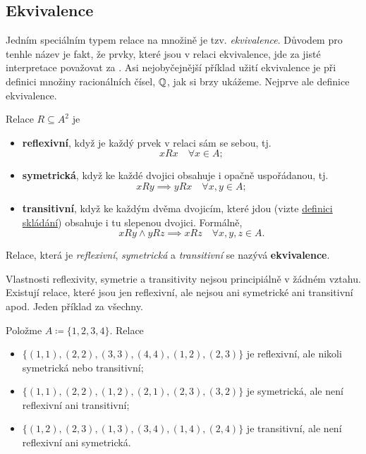 \subsection{Ekvivalence}
\label{ssec:ekvivalence}

Jedním speciálním typem relace na množině je tzv. \emph{ekvivalence}. Důvodem
pro tenhle název je fakt, že prvky, které jsou v relaci ekvivalence, jde za jisté
interpretace považovat za . Asi nejobyčejnější příklad užití
ekvivalence je při definici množiny racionálních čísel, $\mathbb{Q}$, jak si brzy
ukážeme. Nejprve ale definice ekvivalence.

\begin{definition}[Ekvivalence]
 \label{def:ekvivalence}
 Relace $R \subseteq A^2$ je
 \begin{itemize}
  \item \textbf{reflexivní}, když je každý prvek v relaci sám se sebou, tj.
   \[
    xRx \quad \forall x \in A;
   \]
  \item \textbf{symetrická}, když ke každé dvojici obsahuje i opačně
   uspořádanou, tj.
   \[
    xRy \implies yRx \quad \forall x,y \in A;
   \]
  \item \textbf{transitivní}, když ke každým dvěma dvojicím, které jdou
    (vizte \hyperref[def:slozeni-relaci]{definici
   skládání}) obsahuje i tu slepenou dvojici. Formálně,
   \[
    xRy \wedge yRz \implies xRz \quad \forall x,y,z \in A.
   \]
 \end{itemize}
 Relace, která je \emph{reflexivní}, \emph{symetrická} a \emph{transitivní} se
 nazývá \textbf{ekvivalence}.
\end{definition}

Vlastnosti reflexivity, symetrie a transitivity nejsou principiálně v žádném
vztahu. Existují relace, které jsou jen reflexivní, ale nejsou ani symetrické
ani transitivní apod. Jeden příklad za všechny.

\begin{example}
 Položme $A \coloneqq \{1,2,3,4\}$. Relace
 \begin{itemize}
  \item $\{(1,1),(2,2),(3,3),(4,4),(1,2),(2,3)\}$ je reflexivní, ale nikoli
   symetrická nebo transitivní;
  \item $\{(1,1),(2,2),(1,2),(2,1),(2,3),(3,2)\}$ je symetrická, ale není
   reflexivní ani transitivní;
  \item $\{(1,2),(2,3),(1,3),(3,4),(1,4),(2,4)\}$ je transitivní, ale není
   reflexivní ani symetrická.
 \end{itemize}
\end{example}

